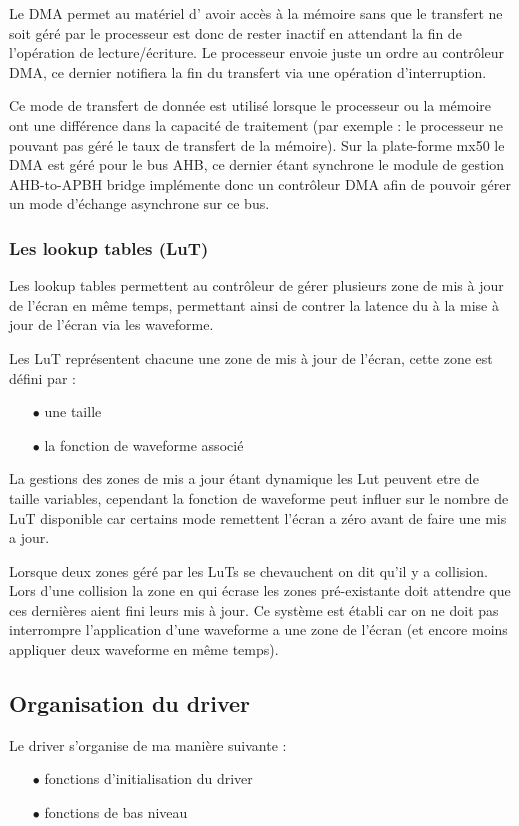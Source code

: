 Le DMA permet au matériel d' avoir accès à la mémoire sans que le transfert ne soit géré par le processeur est donc de rester inactif en attendant la fin de l'opération de lecture/écriture.
Le processeur envoie juste un ordre au contrôleur DMA, ce dernier notifiera la fin du transfert via une opération d'interruption.

Ce mode de transfert de donnée est utilisé lorsque le processeur ou la mémoire ont une différence dans la capacité de traitement (par exemple : le processeur ne pouvant pas géré le taux de transfert de la mémoire).
Sur la plate-forme mx50 le DMA est géré pour le bus AHB, ce dernier étant synchrone le module de gestion AHB-to-APBH bridge implémente donc un contrôleur DMA afin de pouvoir gérer un mode d'échange asynchrone sur ce bus.

\subsubsection{Les lookup tables (LuT)}

Les lookup tables permettent au contrôleur de gérer plusieurs zone de mis à jour de l'écran en même temps, permettant ainsi de contrer la latence du à la mise à jour de l'écran via les waveforme.

Les LuT représentent chacune une zone de mis à jour de l'écran, cette zone est défini par : 
	\begin{itemize}
		\item[$\bullet$] une taille
		\item[$\bullet$] la fonction de waveforme associé
	\end{itemize}
La gestions des zones de mis a jour étant dynamique les Lut peuvent etre de taille variables, cependant la fonction de waveforme peut influer sur le nombre de LuT disponible car certains mode remettent l'écran a zéro avant de faire une mis a jour.

Lorsque deux zones géré par les LuTs se chevauchent on dit qu'il y a collision. Lors d'une collision 
la zone en qui écrase les zones pré-existante doit attendre que ces dernières aient fini leurs mis à jour. Ce système est établi car on ne doit pas interrompre l'application d'une waveforme a une zone de l'écran (et encore moins appliquer deux waveforme en même temps).
\subsection{Organisation du driver}

Le driver s'organise de ma manière suivante : 
	\begin{itemize}
		\item[$\bullet$] fonctions d'initialisation du driver
		\item[$\bullet$] fonctions de bas niveau
	\end{itemize}
	
